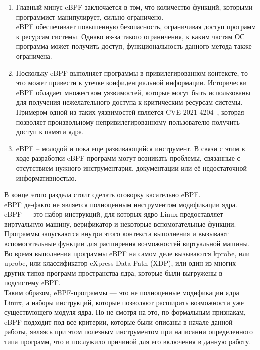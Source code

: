 \begin{enumerate}
    \item Главный минус eBPF заключается в том, что количество функций, которыми программист манипулирует, сильно ограничено.\\
    eBPF обеспечивает повышенную безопасность, ограничивая доступ программ к ресурсам системы.
    Однако из-за такого ограничения, к каким частям ОС программа может получить доступ, функциональность данного метода также ограничена.
    \item Поскольку eBPF выполняет программы в привилегированном контексте, то это может привести к утечке конфиденциальной информации.
    Исторически eBPF обладает множеством уязвимостей, которые могут быть использованы для получения нежелательного доступа к критическим ресурсам системы.
    Примером одной из таких уязвимостей является CVE-2021-4204~\cite{cve-2021-4204}, которая позволяет произвольному непривилегированному пользователю получить доступ к памяти ядра.
    \item eBPF -- молодой и пока еще развивающийся инструмент.
    В связи с этим в ходе разработки eBPF-программ могут возникать проблемы, связанные с отсутствием нужного инструментария, документации или её недостаточной информативностью.
\end{enumerate}
\newpage
В конце этого раздела стоит сделать оговорку касательно eBPF\@.
\vspace{5mm}\\
\indent eBPF де-факто не является полноценным инструментом модификации ядра. eBPF — это набор инструкций, для которых ядро Linux предоставляет виртуальную машину, верификатор и некоторые вспомогательные функции.
Программы запускаются внутри этого контекста выполнения и вызывают вспомогательные функции для расширения возможностей виртуальной машины.
Во время выполнения программы eBPF на самом деле вызываются kprobe, или uprobe, или классификатор eXpress Data Path (XDP),
или один из многих других типов программ пространства ядра, которые были выгружены в подсистему eBPF\@.
\\
Таким образом, eBPF-программы — это не полноценные модификации ядра Linux, а наборы инструкций, которые позволяют расширить возможности уже существующего модуля ядра\@.
Но не смотря на это, по формальным признакам, eBPF подходит под все критерии, которые были описаны в начале данной работы,
являясь при этом полезным инструментом при написании определенного типа программ, что и послужило причиной для его включения в данную работу.
\newpage

